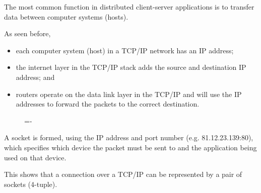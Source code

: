 \documentclass[a4paper]{systems-software}
\begin{document}
The most common function in distributed client-server applications is to transfer data between computer systems (hosts).

As seen before,
\begin{itemize}
	\item each computer system (host) in a TCP/IP network has an IP address;
	\item the internet layer in the TCP/IP stack adds the source and destination IP address; and
	\item routers operate on the data link layer in the TCP/IP and will use the IP addresses to forward the packets to the correct destination.
\end{itemize}

\begin{figure}[H]
	\lineskip=-\fboxrule
\end{figure}

A socket is formed, using the IP address and port number (e.g. 81.12.23.139:80), which specifies which device the packet must be sent to and the application being used on that device.

This shows that a connection over a TCP/IP can be represented by a pair of sockets (4-tuple).
\end{document}
